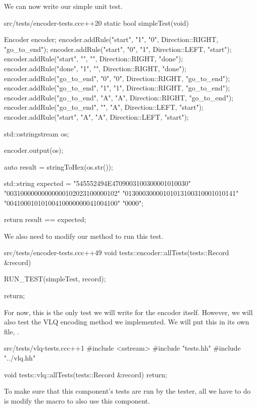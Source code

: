 We can now write our simple unit test.

\begin{file}{src/tests/encoder-tests.cc}{c++}{20}
static bool simpleTest(void)
{
    Encoder encoder;
    encoder.addRule("start", "1", "0", Direction::RIGHT, "go_to_end");
    encoder.addRule("start", "0", "1", Direction::LEFT, "start");
    encoder.addRule("start", "", "", Direction::RIGHT, "done");
    encoder.addRule("done", "1", "", Direction::RIGHT, "done");
    encoder.addRule("go_to_end", "0", "0", Direction::RIGHT, "go_to_end");
    encoder.addRule("go_to_end", "1", "1", Direction::RIGHT, "go_to_end");
    encoder.addRule("go_to_end", "A", "A", Direction::RIGHT, "go_to_end");
    encoder.addRule("go_to_end", "", "A", Direction::LEFT, "start");
    encoder.addRule("start", "A", "A", Direction::LEFT, "start");

    std::ostringstream os;

    encoder.output(os);

    auto result = stringToHex(os.str());

    std::string expected =
        "545552494E4709003100300001010030"
        "00310000000000000102023100000102"
        "01300030000101013100310001010141"
        "00410001010100410000000041004100"
        "0000";

    return result == expected;
}
\end{file}

We also need to modify our  method to run this test.

\begin{file}{src/tests/encoder-tests.cc}{c++}{49}
void tests::encoder::allTests(tests::Record &record)
{
    RUN_TEST(simpleTest, record);

    return;
}
\end{file}

For now, this is the only test we will write for the encoder itself. However, we will also test the VLQ encoding method we implemented. We will put this in its own file, .

\begin{file}{src/tests/vlq-tests.cc}{c++}{1}
#include <sstream>
#include "tests.hh"
#include "../vlq.hh"

void tests::vlq::allTests(tests::Record &record) {
    return;
}
\end{file}

To make sure that this component's tests are run by the tester, all we have to do is modify the  macro to also use this component.

